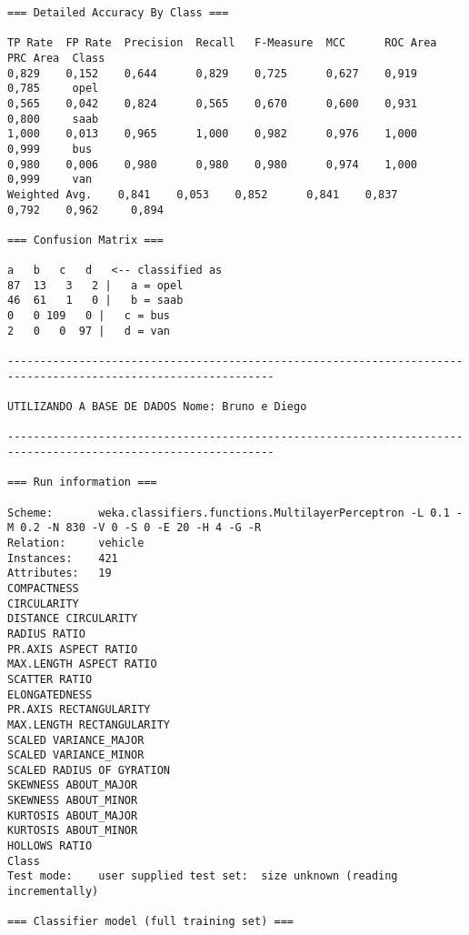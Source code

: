 \documentclass[
	article,			%
	11pt,				%
	oneside,			%
	a4paper,			%
	english,			%
	brazil,				%
	sumario=tradicional
	]{abntex2}
\begin{document}
\begin{lstlisting}
=== Detailed Accuracy By Class ===

TP Rate  FP Rate  Precision  Recall   F-Measure  MCC      ROC Area  PRC Area  Class
0,829    0,152    0,644      0,829    0,725      0,627    0,919     0,785     opel
0,565    0,042    0,824      0,565    0,670      0,600    0,931     0,800     saab
1,000    0,013    0,965      1,000    0,982      0,976    1,000     0,999     bus
0,980    0,006    0,980      0,980    0,980      0,974    1,000     0,999     van
Weighted Avg.    0,841    0,053    0,852      0,841    0,837      0,792    0,962     0,894     

=== Confusion Matrix ===

a   b   c   d   <-- classified as
87  13   3   2 |   a = opel
46  61   1   0 |   b = saab
0   0 109   0 |   c = bus
2   0   0  97 |   d = van

---------------------------------------------------------------------------------------------------------------

UTILIZANDO A BASE DE DADOS Nome: Bruno e Diego

---------------------------------------------------------------------------------------------------------------

=== Run information ===

Scheme:       weka.classifiers.functions.MultilayerPerceptron -L 0.1 -M 0.2 -N 830 -V 0 -S 0 -E 20 -H 4 -G -R
Relation:     vehicle
Instances:    421
Attributes:   19
COMPACTNESS
CIRCULARITY
DISTANCE CIRCULARITY
RADIUS RATIO
PR.AXIS ASPECT RATIO
MAX.LENGTH ASPECT RATIO
SCATTER RATIO
ELONGATEDNESS
PR.AXIS RECTANGULARITY
MAX.LENGTH RECTANGULARITY
SCALED VARIANCE_MAJOR
SCALED VARIANCE_MINOR
SCALED RADIUS OF GYRATION
SKEWNESS ABOUT_MAJOR
SKEWNESS ABOUT_MINOR
KURTOSIS ABOUT_MAJOR
KURTOSIS ABOUT_MINOR
HOLLOWS RATIO
Class
Test mode:    user supplied test set:  size unknown (reading incrementally)

=== Classifier model (full training set) ===


\end{lstlisting}
\end{document}
